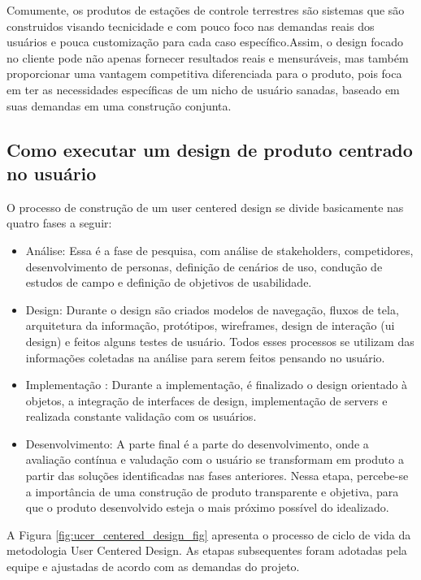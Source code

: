 Comumente, os produtos de estações de controle terrestres são sistemas que são construidos visando tecnicidade e com pouco foco nas demandas reais dos usuários e pouca customização para cada caso específico.Assim, o design focado no cliente pode não apenas fornecer resultados reais e mensuráveis, mas também proporcionar uma vantagem competitiva diferenciada para o produto, pois foca em ter as necessidades específicas de um nicho de usuário sanadas, baseado em suas demandas em uma construção conjunta.

\subsection{Como executar um design de produto centrado no usuário}

O processo de construção de um user centered design se divide basicamente nas quatro fases a seguir:

\begin{itemize}
    \item Análise: Essa é  a fase de pesquisa, com análise de stakeholders, competidores, desenvolvimento de personas, definição de cenários de uso, condução de estudos de campo e definição de objetivos de usabilidade. 
    \item Design: Durante o design são criados modelos de navegação, fluxos de tela, arquitetura da informação, protótipos, wireframes, design de interação (ui design) e feitos alguns testes de usuário. Todos esses processos se utilizam das informações coletadas na análise para serem feitos pensando no usuário.
    \item Implementação : Durante a implementação, é finalizado o design orientado à objetos, a integração de interfaces de design, implementação de servers e realizada constante validação com os usuários.
    \item Desenvolvimento: A parte final é a parte do desenvolvimento, onde a avaliação contínua e valudação com o usuário se transformam em produto a partir das soluções identificadas nas fases anteriores. Nessa etapa, percebe-se a importância de uma construção de produto transparente e objetiva, para que o produto desenvolvido esteja o mais próximo possível do idealizado. 
\end{itemize}

A Figura \ref{fig:ucer_centered_design_fig} apresenta o processo de ciclo de vida da metodologia User Centered Design. As etapas subsequentes foram adotadas pela equipe e ajustadas de acordo com as demandas do projeto. 

